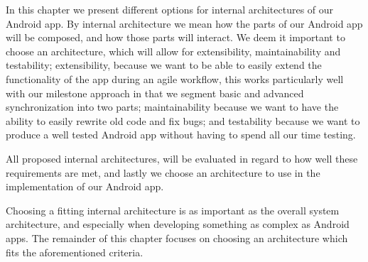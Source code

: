 In this chapter we present different options for internal architectures of our Android app.
By internal architecture we mean how the parts of our Android app will be composed, and how those parts will interact.
We deem it important to choose an architecture, which will allow for extensibility, maintainability and testability;
extensibility, because we want to be able to easily extend the functionality of the app during an agile workflow, this works particularly well with our milestone approach in that we segment basic and advanced synchronization into two parts;
maintainability because we want to have the ability to easily rewrite old code and fix bugs;
and testability because we want to produce a well tested Android app without having to spend all our time testing.

All proposed internal architectures, will be evaluated in regard to how well these requirements are met, and lastly we choose an architecture to use in the implementation of our Android app.

Choosing a fitting internal architecture is as important as the overall system architecture, and especially when developing something as complex as Android apps.
The remainder of this chapter focuses on choosing an architecture which fits the aforementioned criteria.
